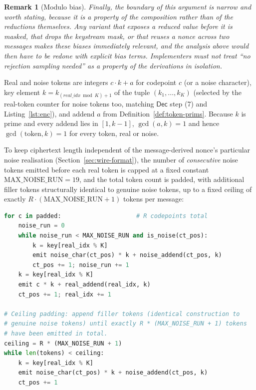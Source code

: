 \documentclass[11pt,a4paper]{article}
\newtheorem{remark}[theorem]{Remark}
\begin{document}
\begin{remark}[Modulo bias]
Finally, the boundary of this argument is narrow and worth stating, because
it is a property of the composition rather than of the reductions
themselves. Any variant that exposes a reduced value before it is masked,
that drops the keystream mask, or that reuses a nonce across two messages
makes these biases immediately relevant, and the analysis above would then
have to be redone with explicit bias terms. Implementers must not treat
``no rejection sampling needed'' as a property of the derivations in
isolation.
\end{remark}

Real and noise tokens are integers $c\cdot k + a$ for codepoint $c$
(or a noise character), key element $k=k_{(real\_idx \bmod K)+1}$ of the
tuple $(k_1,\ldots,k_K)$ (selected by the real-token counter for noise
tokens too, matching $\mathsf{Dec}$ step (7) and Listing~\ref{lst:enc}), and addend
$a$ from Definition~\ref{def:token-prims}. Because $k$ is prime and every
addend lies in $[1,k-1]$, $\gcd(a,k)=1$ and hence $\gcd(\text{token},k)=1$
for every token, real or noise.

To keep ciphertext length independent of the message-derived nonce's
particular noise realisation (Section~\ref{sec:wire-format}), the number
of \emph{consecutive} noise tokens emitted before each real token is capped
at a fixed constant $\mathrm{MAX\_NOISE\_RUN}=19$, and the total token
count is padded, with additional filler tokens structurally identical to
genuine noise tokens, up to a fixed ceiling of exactly
$R\cdot(\mathrm{MAX\_NOISE\_RUN}+1)$ tokens per message:

\begin{lstlisting}[language=Python, caption={Token emission (encoding)}, label={lst:enc}]
for c in padded:                     # R codepoints total
    noise_run = 0
    while noise_run < MAX_NOISE_RUN and is_noise(ct_pos):
        k = key[real_idx % K]
        emit noise_char(ct_pos) * k + noise_addend(ct_pos, k)
        ct_pos += 1; noise_run += 1
    k = key[real_idx % K]
    emit c * k + real_addend(real_idx, k)
    ct_pos += 1; real_idx += 1

# Ceiling padding: append filler tokens (identical construction to
# genuine noise tokens) until exactly R * (MAX_NOISE_RUN + 1) tokens
# have been emitted in total.
ceiling = R * (MAX_NOISE_RUN + 1)
while len(tokens) < ceiling:
    k = key[real_idx % K]
    emit noise_char(ct_pos) * k + noise_addend(ct_pos, k)
    ct_pos += 1
\end{lstlisting}
\end{document}

